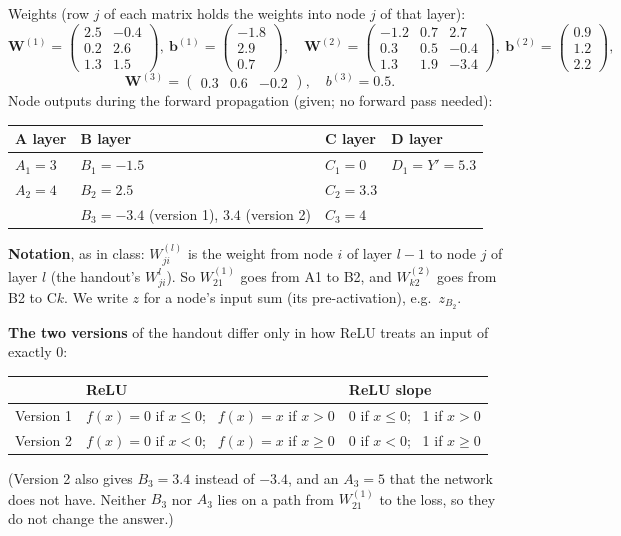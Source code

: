 \documentclass[11pt]{article}
\begin{document}
Weights (row $j$ of each matrix holds the weights into node $j$ of that layer):
\[
\bm{W}^{(1)} = \begin{pmatrix} 2.5 & -0.4 \\ 0.2 & 2.6 \\ 1.3 & 1.5 \end{pmatrix},\
\bm{b}^{(1)} = \begin{pmatrix} -1.8 \\ 2.9 \\ 0.7 \end{pmatrix},\quad
\bm{W}^{(2)} = \begin{pmatrix} -1.2 & 0.7 & 2.7 \\ 0.3 & 0.5 & -0.4 \\ 1.3 & 1.9 & -3.4 \end{pmatrix},\
\bm{b}^{(2)} = \begin{pmatrix} 0.9 \\ 1.2 \\ 2.2 \end{pmatrix},
\]
\[
\bm{W}^{(3)} = \begin{pmatrix} 0.3 & 0.6 & -0.2 \end{pmatrix},\quad b^{(3)} = 0.5 .
\]
Node outputs during the forward propagation (given; no forward pass needed):
\begin{center}
\renewcommand{\arraystretch}{1.15}
\begin{tabular}{|l|l|l|l|}
\hline
A layer & B layer & C layer & D layer \\ \hline
$A_1 = 3$ & $B_1 = -1.5$ & $C_1 = 0$ & $D_1 = Y' = 5.3$ \\
$A_2 = 4$ & $B_2 = 2.5$ & $C_2 = 3.3$ & \\
 & $B_3 = -3.4$ (version 1), $3.4$ (version 2) & $C_3 = 4$ & \\ \hline
\end{tabular}
\end{center}

\textbf{Notation}, as in class: $W^{(l)}_{ji}$ is the weight from node $i$ of layer $l-1$ to node $j$ of
layer $l$ (the handout's $W^l_{ji}$). So $W^{(1)}_{21}$ goes from A1 to B2, and $W^{(2)}_{k2}$ goes from
B2 to C$k$. We write $z$ for a node's input sum (its pre-activation), e.g.\ $z_{B_2}$.

\textbf{The two versions} of the handout differ only in how ReLU treats an input of exactly 0:

\begin{center}
\renewcommand{\arraystretch}{1.15}
\begin{tabular}{|l|l|l|}
\hline
& \textbf{ReLU} & \textbf{ReLU slope} \\ \hline
Version 1 & $f(x) = 0$ if $x \le 0$; \ $f(x) = x$ if $x > 0$ & 0 if $x \le 0$; \ 1 if $x > 0$ \\ \hline
Version 2 & $f(x) = 0$ if $x < 0$; \ $f(x) = x$ if $x \ge 0$ & 0 if $x < 0$; \ 1 if $x \ge 0$ \\ \hline
\end{tabular}
\end{center}
(Version 2 also gives $B_3 = 3.4$ instead of $-3.4$, and an $A_3 = 5$ that the network does not have.
Neither $B_3$ nor $A_3$ lies on a path from $W^{(1)}_{21}$ to the loss, so they do not change the answer.)
\end{document}
